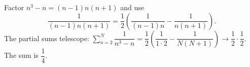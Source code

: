 Factor $n^3-n=(n-1)n(n+1)$ and use
\[
\dfrac{1}{(n-1)n(n+1)}=\dfrac{1}{2}\left(\dfrac{1}{(n-1)n}-\dfrac{1}{n(n+1)}\right).
\]
The partial sums telescope: $\displaystyle\sum_{n=2}^{N}\dfrac{1}{n^3-n}=\dfrac{1}{2}\left(\dfrac{1}{1\cdot2}-\dfrac{1}{N(N+1)}\right)\to\dfrac{1}{2}\cdot\dfrac{1}{2}$. The sum is $\boxed{\dfrac{1}{4}}$.
